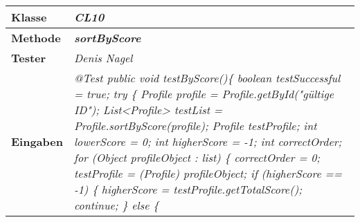 \begin{longtable}{|p{4cm}|p{11cm}|}
\hline
\textbf{Klasse} & \textit{\textbf{CL10}} \\
\hline
\textbf{Methode} & \textit{\textbf{sortByScore}} \\
\hline
\textbf{Tester} & \textit{Denis Nagel} \\
\hline
\textbf{Eingaben} & \textit{
@Test \newline
public void testByScore()\{ \newline
\hspace*{3mm}    boolean testSuccessful = true; \newline
\hspace*{3mm}    try \{ \newline
\hspace*{6mm}      	 Profile profile = Profile.getById("gültige ID"); \newline
\hspace*{6mm}        List<Profile> testList = Profile.sortByScore(profile); \newline
\hspace*{6mm}        Profile testProfile; \newline
\hspace*{6mm}        int lowerScore = 0; \newline
\hspace*{6mm}        int higherScore = -1; \newline
\hspace*{6mm}        int correctOrder; \newline
\hspace*{6mm}        for (Object profileObject : list) \{ \newline
\hspace*{9mm}            correctOrder = 0; \newline
\hspace*{9mm}            testProfile = (Profile) profileObject; \newline
\hspace*{9mm}            if (higherScore == -1) \{ \newline
\hspace*{12mm}                higherScore = testProfile.getTotalScore(); \newline
\hspace*{12mm}                continue; \newline
\hspace*{9mm}            \} else \{ \newline
}
\end{longtable}
